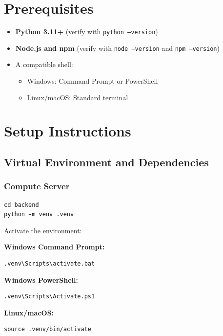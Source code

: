 \documentclass{article}
\begin{document}
\section{Prerequisites}
\begin{itemize}
    \item \textbf{Python 3.11+} (verify with \texttt{python --version})
    \item \textbf{Node.js and npm} (verify with \texttt{node --version} and \texttt{npm --version})
    \item A compatible shell:
    \begin{itemize}
        \item Windows: Command Prompt or PowerShell
        \item Linux/macOS: Standard terminal
    \end{itemize}
\end{itemize}

\section{Setup Instructions}

\subsection{Virtual Environment and Dependencies}

\subsubsection*{Compute Server}

\begin{Verbatim}[fontsize=\small]
cd backend
python -m venv .venv
\end{Verbatim}

Activate the environment:

\textbf{Windows Command Prompt:}
\begin{Verbatim}[fontsize=\small]
.venv\Scripts\activate.bat
\end{Verbatim}

\textbf{Windows PowerShell:}
\begin{Verbatim}[fontsize=\small]
.venv\Scripts\Activate.ps1
\end{Verbatim}

\textbf{Linux/macOS:}
\begin{Verbatim}[fontsize=\small]
source .venv/bin/activate
\end{Verbatim}
\end{document}

